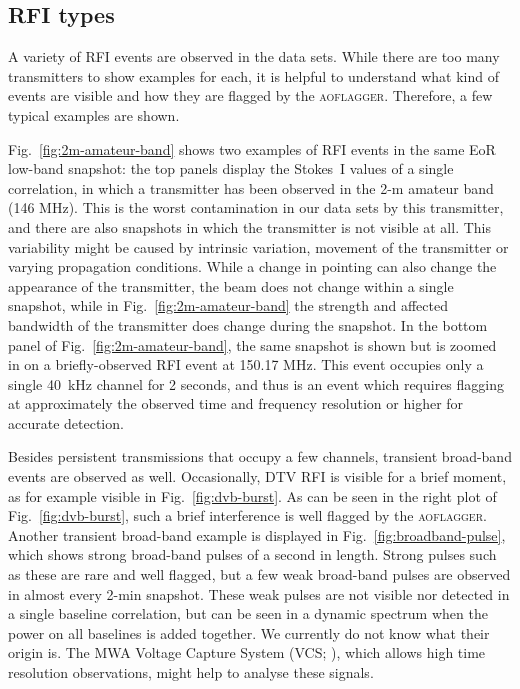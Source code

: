 \documentclass{pasa}
\begin{document}
\subsection{RFI types}
A variety of RFI events are observed in the data sets. While there are too many transmitters to show examples for each, it is helpful to understand what kind of events are visible and how they are flagged by the \textsc{aoflagger}. Therefore, a few typical examples are shown.

Fig.~\ref{fig:2m-amateur-band} shows two examples of RFI events in the same EoR low-band snapshot: the top panels display the Stokes~I values of a single correlation, in which a transmitter has been observed in the 2-m amateur band (146 MHz). This is the worst contamination in our data sets by this transmitter, and there are also snapshots in which the transmitter is not visible at all. This variability might be caused by intrinsic variation, movement of the transmitter or varying propagation conditions. While a change in pointing can also change the appearance of the transmitter, the beam does not change within a single snapshot, while in Fig.~\ref{fig:2m-amateur-band} the strength and affected bandwidth of the transmitter does change during the snapshot. In the bottom panel of Fig.~\ref{fig:2m-amateur-band}, the same snapshot is shown but is zoomed in on a briefly-observed RFI event at 150.17 MHz. This event occupies only a single 40~kHz channel for 2 seconds, and thus is an event which requires flagging at approximately the observed time and frequency resolution or higher for accurate detection.

Besides persistent transmissions that occupy a few channels, transient broad-band events are observed as well. Occasionally, DTV RFI is visible for a brief moment, as for example visible in Fig.~\ref{fig:dvb-burst}. As can be seen in the right plot of Fig.~\ref{fig:dvb-burst}, such a brief interference is well flagged by the \textsc{aoflagger}. Another transient broad-band example is displayed in Fig.~\ref{fig:broadband-pulse}, which shows strong broad-band pulses of a second in length. Strong pulses such as these are rare and well flagged, but a few weak broad-band pulses are observed in almost every 2-min snapshot. These weak pulses are not visible nor detected in a single baseline correlation, but can be seen in a dynamic spectrum when the power on all baselines is added together. We currently do not know what their origin is. The MWA Voltage Capture System (VCS; \citealt{mwa-voltage-capture-2014}), which allows high time resolution observations, might help to analyse these signals.
\end{document}
